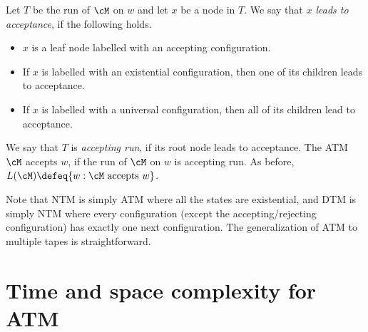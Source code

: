 \documentclass[11pt, a4paper]{article}
\begin{document}
Let $T$ be the run of $\cM$ on $w$
and let $x$ be a node in $T$.
We say that {\em $x$ leads to acceptance}, if the following holds.
\begin{itemize}
\item
$x$ is a leaf node labelled with an accepting configuration.
\item
If $x$ is labelled with an existential configuration, 
then one of its children leads to acceptance.
\item
If $x$ is labelled with a universal configuration, 
then all of its children lead to acceptance.
\end{itemize}
We say that $T$ is {\em accepting run}, if its root node leads to acceptance.
The ATM $\cM$ accepts $w$, if the run of $\cM$ on $w$ is accepting run.
As before, $L(\cM)\defeq \{w : \cM \ \text{accepts}\ w\}$.

Note that NTM is simply ATM where all the states are existential,
and DTM is simply NTM where every configuration (except the accepting/rejecting configuration)
has exactly one next configuration.
The generalization of ATM to multiple tapes is straightforward.

\section{Time and space complexity for ATM}
\end{document}
